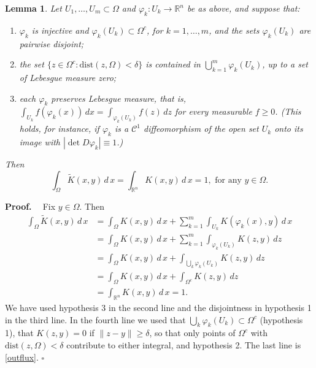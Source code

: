 \documentclass[a4paper,12pt]{amsart}
\newtheorem{lemma}[theorem]{Lemma}
\renewcommand{\proof}{{\noindent \bf Proof. \ }}
\newcommand{\eproof}{\hfill \mbox{${\square}$}}
\newcommand{\R}{\mathbb{R}}
\newcommand{\dist}{\textrm{dist}}
\begin{document}
  \begin{lemma}\label{const_integral}
  {Let $U_1, \dots, U_m \subset \Omega$ and $\varphi_k: U_k \to \R^n$ be as above, and suppose that:}
  \begin{enumerate}
  \item {$\varphi_k$ is injective and $\varphi_k(U_k) \subset \Omega^c$, for $k=1, \dots, m$, and the sets $\varphi_k(U_k)$ are pairwise disjoint;}
   \item {the set $\{ z \in \Omega^c : \dist(z, \Omega) < \delta\}$ is contained in $\bigcup_{k=1}^m \varphi_k(U_k)$, up to a set of Lebesgue measure zero;}
   \item {each $\varphi_k$ preserves Lebesgue measure, that is,
   $\int_{U_k} f(\varphi_k(x))\, dx = \int_{\varphi_k(U_k)} f(z)\, dz$ for every measurable $f \geq 0$.
   (This holds, for instance, if $\varphi_k$ is a $\mathcal{C}^1$ diffeomorphism of the open set $U_k$ onto its image with $|\det D\varphi_k| \equiv 1$.)}
  \end{enumerate}
  Then
  \[ \int_{\Omega}   \tilde{K}(x,y)\, d \,x    =  \int_{\R^n}   K(x,y)\, d \,x = 1, \textrm {\ for any } y\in \Omega.\]
 \end{lemma}

  \proof
  {Fix $y \in \Omega$. Then
   \begin{align*}
         \int_{\Omega}   \tilde{K}(x,y)\, d \,x   & =
          \int_{\Omega}   {K}(x,y)\, d \,x  + \sum_{k=1}^m
           \int_{U_k}   {K}(\varphi_k(x),y)\, d \,x \\
               & =       \int_{\Omega}    K(x,y) \, d \, x  +
 \sum_{k=1}^m   \int_{\varphi_{k}(U_k)} K(z,y) \, dz   \\
  & =   \int_{\Omega}    K(x,y) \, d \, x  +   \int_{ \bigcup_k \varphi_k (U_k) } K(z,y) \, dz  \\
    & =  \int_{\Omega}    K(x,y) \, d \, x  + \int_{ \Omega^c } K(z,y) \, dz  \\
    & =  \int_{\R^n}    K(x,y) \, d \, x = 1.
  \end{align*}
  We have used hypothesis 3 in the second line and the disjointness in hypothesis 1 in the third line.
  In the fourth line we used that $\bigcup_k \varphi_k(U_k) \subset \Omega^c$ (hypothesis 1), that
  $K(z,y) = 0$ if $\|z-y\| \geq \delta$, so that only points of $\Omega^c$ with $\dist(z,\Omega) < \delta$ contribute to either integral, and hypothesis 2. The last line is \eqref{outflux}.}
 \eproof
\end{document}
